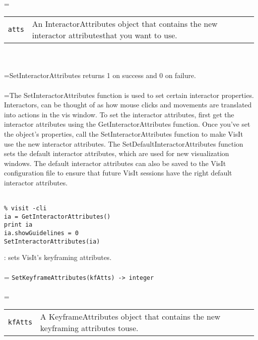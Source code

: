 \documentclass[10pt,a4paper]{report}
\begin{document}
 \\ 
\hangindent=\parindent 
\begin{tabular}{lp{9cm}}
\verb!atts! & An InteractorAttributes object that contains the new interactor attributesthat you want to use. \\
\end{tabular} \\[-2mm]


 \\ 
\hangindent=\parindent SetInteractorAttributes returns 1 on success and 0 on failure. \\[-3mm] 

 \\ 
\hangindent=\parindent The SetInteractorAttributes function is used to set certain interactor properties. Interactors, can be thought of as how mouse clicks and movements are translated into actions in the vis window. To set the interactor attributes, first get the interactor attributes using the GetInteractorAttributes function. Once you've set the object's properties, call the SetInteractorAttributes function to make VisIt use the new interactor attributes. The SetDefaultInteractorAttributes function sets the default interactor attributes, which are used for new visualization windows. The default interactor attributes can also be saved to the VisIt configuration file to ensure that future VisIt sessions have the right default interactor attributes. \\[-3mm] 

\\[-6mm]
\begin{verbatim}% visit -cli
ia = GetInteractorAttributes()
print ia
ia.showGuidelines = 0
SetInteractorAttributes(ia)
\end{verbatim}
\newpage


{}
: sets VisIt's keyframing attributes.\\[-3mm]

 \\ 
\hangindent=\parindent 
\verb!SetKeyframeAttributes(kfAtts) -> integer!\\ [-3mm]

 \\ 
\hangindent=\parindent 
\begin{tabular}{lp{9cm}}
\verb!kfAtts! & A KeyframeAttributes object that contains the new keyframing attributes touse. \\
\end{tabular} \\[-2mm]
\end{document}
